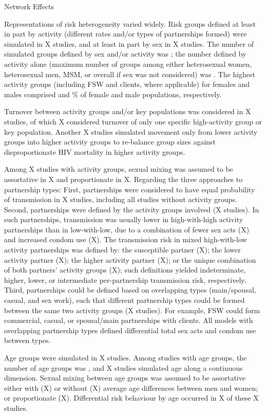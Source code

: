 Network Effects

Representations of risk heterogeneity varied widely.
Risk groups defined at least in part by activity
(different rates and/or types of partnerships formed) were simulated in X studies,
and at least in part by sex in X studies.
The number of simulated groups defined by sex and/or activity was ;
the number defined by activity alone (maximum number of groups among either
heterosexual women, heterosexual men, MSM, or overall if sex was not considered) was .
The highest activity groups (including FSW and clients, where applicable) for females and males comprised
 and  \% of female and male populations, respectively.

Turnover between activity groups and/or key populations
was considered in X studies,
of which X considered turnover of only
one specific high-activity group or key population.
Another X studies simulated
movement only from lower activity groups into higher activity groups
to re-balance group sizes against disproportionate HIV mortality in higher activity groups.

Among X studies with activity groups, sexual mixing was assumed to be
assortative in X and proportionate in X.
Regarding the three approaches to partnership types:
First, partnerships were considered to have equal probability of transmission in
X studies, including all studies without activity groups.
Second, partnerships were defined by the activity groups involved (X studies).
In such partnerships, transmission was usually
lower in high-with-high activity partnerships than in low-with-low, due to a combination of
fewer sex acts (X) and
increased condom use (X).
The transmission risk in mixed high-with-low activity partnerships was defined by:
the susceptible partner (X);
the lower activity partner (X);
the higher activity partner (X); or
the unique combination of both partners' activity groups (X);
such definitions yielded indeterminate, higher, lower, or intermediate
per-partnership transmission risk, respectively.
Third, partnerships could be defined based on overlapping types
(main/spousal, casual, and sex work), such that
different partnership types could be formed between the same two activity groups (X studies).
For example, FSW could form commercial, casual, or spousal/main partnerships with clients.
All models with overlapping partnership types defined differential total sex acts and condom use between types.

Age groups were simulated in X studies.
Among studies with age groups, the number of age groups was ,
and X studies simulated age along a continuous dimension.
Sexual mixing between age groups was assumed to be assortative
either with (X) or without (X)
average age differences between men and women;
or proportionate (X).
Differential risk behaviour by age occurred in X of these X studies.

